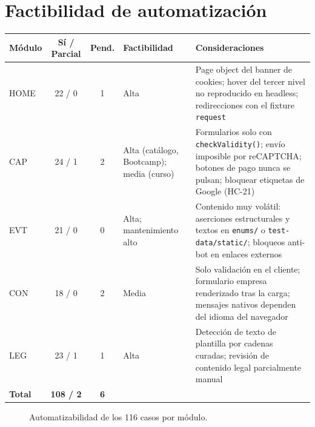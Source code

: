 \documentclass[11pt,a4paper]{article}
\newcommand{\code}[1]{\texttt{#1}}
\begin{document}
\section{Factibilidad de automatización}

\begin{table}[H]
\centering\small
\begin{tabularx}{\textwidth}{@{}l c c >{\raggedright\arraybackslash}p{} X@{}}
\toprule
Módulo & Sí / Parcial & Pend. & Factibilidad & Consideraciones \\
\midrule
HOME & 22 / 0 & 1 & Alta & Page object del banner de cookies; hover del tercer nivel no
  reproducido en headless; redirecciones con el fixture \code{request} \\
CAP & 24 / 1 & 2 & Alta (catálogo, Bootcamp); media (curso) & Formularios solo con
  \code{checkValidity()}; envío imposible por reCAPTCHA; botones de pago nunca se pulsan;
  bloquear etiquetas de Google (\mbox{HC-21}) \\
EVT & 21 / 0 & 0 & Alta; mantenimiento alto & Contenido muy volátil: aserciones estructurales
  y textos en \code{enums/} o \code{test-data/static/}; bloqueos anti-bot en enlaces externos \\
CON & 18 / 0 & 2 & Media & Solo validación en el cliente; formulario empresa renderizado tras
  la carga; mensajes nativos dependen del idioma del navegador \\
LEG & 23 / 1 & 1 & Alta & Detección de texto de plantilla por cadenas curadas; revisión de
  contenido legal parcialmente manual \\
\midrule
\textbf{Total} & \textbf{108 / 2} & \textbf{6} & & \\
\bottomrule
\end{tabularx}
\end{table}

\begin{figure}[H]
\centering
{}
\caption{Automatizabilidad de los 116 casos por módulo.}
\end{figure}
\end{document}
